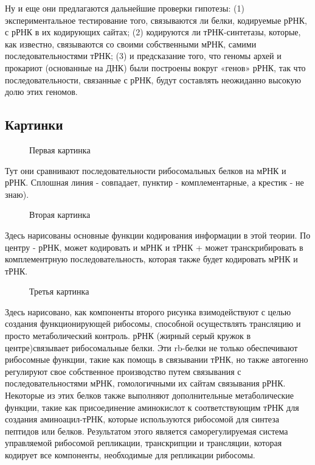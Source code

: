 Ну и еще они предлагаются дальнейшие проверки гипотезы: (1) экспериментальное тестирование того, связываются ли белки, кодируемые рРНК, с рРНК в их кодирующих сайтах; (2) кодируются ли тРНК-синтетазы, которые, как известно, связываются со своими собственными мРНК, самими последовательностями тРНК; (3) и предсказание того, что геномы архей и прокариот (основанные на ДНК) были построены вокруг «генов» рРНК, так что последовательности, связанные с рРНК, будут составлять неожиданно высокую долю этих геномов.

\subsection{Картинки}
\begin{figure}[H]\label{ul}
	\caption{Первая картинка}
\end{figure} 
Тут они сравнивают последовательности рибосомальных белков на мРНК и рРНК. Сплошная линия - совпадает, пунктир - комплементарные, а крестик - не знаю).
\begin{figure}[H]\label{ul}
	\caption{Вторая картинка}
\end{figure} 
Здесь нарисованы основные функции кодирования информации в этой теории. По центру - рРНК, может кодировать и мРНК и тРНК + может транскрибировать в комплементрную последовательность, которая также будет кодировать мРНК и тРНК.
\begin{figure}[H]\label{ul}
	\caption{Третья картинка}
\end{figure} 
Здесь нарисовано, как компоненты второго рисунка взимодействуют с целью создания функционирующей рибосомы, способной осуществлять трансляцию и просто метаболический контроль. рРНК (жирный серый кружок в центре)связывает рибосомальные белки. Эти rb-белки не только обеспечивают рибосомные функции, такие как помощь в связывании тРНК, но также автогенно регулируют свое собственное производство путем связывания с последовательностями мРНК, гомологичными их сайтам связывания рРНК. Некоторые из этих белков также выполняют дополнительные метаболические функции, такие как присоединение аминокислот к соответствующим тРНК для создания аминоацил-тРНК, которые используются рибосомой для синтеза пептидов или белков. Результатом этого является саморегулируемая система управляемой рибосомой репликации, транскрипции и трансляции, которая кодирует все компоненты, необходимые для репликации рибосомы.